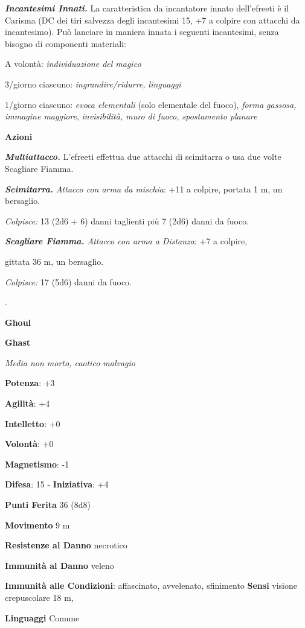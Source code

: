 \begin{multicols}{2}
\emph{\textbf{Incantesimi Innati.}} La caratteristica da incantatore
innato dell'efreeti è il Carisma (DC dei tiri salvezza degli incantesimi
15, +7 a colpire con attacchi da incantesimo). Può lanciare in maniera
innata i seguenti incantesimi, senza bisogno di componenti materiali:

A volontà: \emph{individuazione del magico}

3/giorno ciascuno: \emph{ingrandire/ridurre, linguaggi}

1/giorno ciascuno: \emph{evoca elementali} (solo elementale del fuoco),
\emph{forma gassosa, immagine maggiore}, \emph{invisibilità, muro di
fuoco, spostamento planare}

\smallskip\textbf{Azioni}

\emph{\textbf{Multiattacco.}} L'efreeti effettua due attacchi di
scimitarra o usa due volte Scagliare Fiamma.

\emph{\textbf{Scimitarra.} Attacco con arma da mischia}: +11 a colpire,
portata 1 m, un bersaglio.

\emph{Colpisce:} 13 (2d6 + 6) danni taglienti più 7 (2d6) danni da
fuoco.

\emph{\textbf{Scagliare Fiamma.} Attacco con arma a Distanza}: +7 a
colpire,

gittata 36 m, un bersaglio.

\emph{Colpisce:} 17 (5d6) danni da fuoco.

.

\textbf{Ghoul}

\textbf{Ghast}

\emph{Media non morto, caotico malvagio}

\textbf{Potenza}: +3

\textbf{Agilità}: +4

\textbf{Intelletto}: +0

\textbf{Volontà}: +0

\textbf{Magnetismo}: -1

\textbf{Difesa}: 15 - \textbf{Iniziativa}: +4

\textbf{Punti Ferita} 36 (8d8)

\textbf{Movimento} 9 m

\textbf{Resistenze al Danno} necrotico

\textbf{Immunità al Danno} veleno

\textbf{Immunità alle Condizioni}: affascinato, avvelenato, sfinimento
\textbf{Sensi} visione crepuscolare 18 m, 

\textbf{Linguaggi} Comune


\end{multicols}
